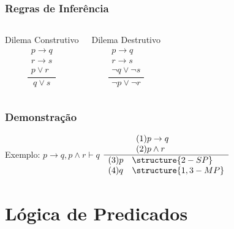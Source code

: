 \documentclass[aspectratio=169]{beamer} %
\begin{document}
\begin{frame}
\frametitle{Regras de Inferência}

\begin{columns}[c]
	\large
	\begin{block}{Dilema Construtivo}
		\large
		\begin{equation*}
		\frac{\begin{array}{l} p \rightarrow q \\ r \rightarrow s \\ p \vee r \end{array}}{q \vee s}
		\end{equation*}
	\end{block}	
	
	\begin{block}{Dilema Destrutivo}
		\large
		\begin{equation*}
		\frac{\begin{array}{l} p \rightarrow q \\ r \rightarrow s \\ \neg q \vee \neg s \end{array}}{\neg p \vee \neg r}
		\end{equation*}
	\end{block}	
\end{columns}
\end{frame}

\begin{frame}
\frametitle{Demonstração}

	\begin{exampleblock}{Exemplo: $p \rightarrow q, p \wedge r  \vdash q$}
		\large
		$\frac{\begin{array}{ll} (1) p \rightarrow q & ~~~~\\ (2) p \wedge r ~~~~\end{array}}{\begin{array}{ll} (3) p & \structure{2 - SP}   \\ (4) q & \structure{1,3 - MP}\end{array}}$
	\end{exampleblock}
\end{frame}

\section{Lógica de Predicados}
\end{document}
